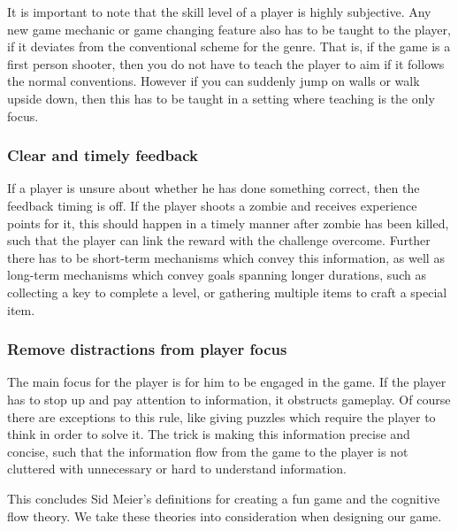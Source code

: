 It is important to note that the skill level of a player is highly subjective.
Any new game mechanic or game changing feature also has to be taught to the player, if it deviates from the conventional scheme for the genre.
That is, if the game is a first person shooter, then you do not have to teach
the player to aim if it follows the normal conventions. However if you can suddenly
jump on walls or walk upside down, then this has to be taught in a setting
where teaching is the only focus.

\subsubsection{Clear and timely feedback}
If a player is unsure about whether he has done something correct, then the feedback timing is off.
If the player shoots a zombie and receives experience points for it, this should happen in a timely manner after zombie has been killed, such that the player can link the reward with the challenge overcome.
Further there has to be short-term mechanisms which convey this information, as well as long-term mechanisms which convey goals spanning longer durations,
such as collecting a key to complete a level, or gathering multiple items to craft a special item.

\subsubsection{Remove distractions from player focus}\label{introductions:makingthegamefun:removedistractionsfromplayerfocus}
The main focus for the player is for him to be engaged in the game.
If the player has to stop up and pay attention to information, it obstructs gameplay.
Of course there are exceptions to this rule, like giving puzzles which require the player to think in order to solve it.
The trick is making this information precise and concise, such that the
information flow from the game to the player is not cluttered with unnecessary or hard to understand information.

This concludes Sid Meier's definitions for creating a fun game and the
cognitive flow theory.
We take these theories into consideration when designing our game.
